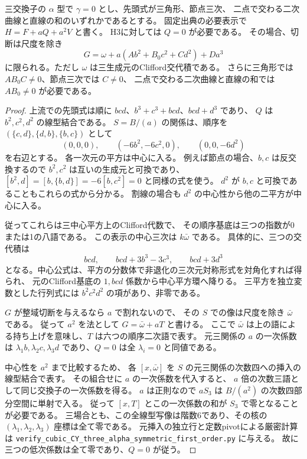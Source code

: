 \begin{proposition}\label{prop:cubic-CY-three-alpha-symmetric-singular}
三交換子の $\alpha$ 型で $\gamma=0$ とし、先頭式が三角形、節点三次、
二点で交わる二次曲線と直線の和のいずれかであるとする。
固定出典\cite{AS4CYpinned}の必要表示で $H=F+aQ+a^2V$ と書く。
H3に対しては $Q=0$ が必要である。
その場合、切断は尺度を除き
\[
 G=\omega+a(A b^2+B_0 c^2+C d^2)+D a^3
\]
に限られる。ただし $\omega$ は三生成元のClifford交代積である。
さらに三角形では $AB_0C\ne0$、節点三次では $C\ne0$、
二点で交わる二次曲線と直線の和では $AB_0\ne0$ が必要である。
\end{proposition}
\begin{proof}
上流での先頭式は順に $bcd$、$b^3+c^3+bcd$、$bcd+d^3$ であり、
$Q$ は $b^2,c^2,d^2$ の線型結合である。
$S=B/(a)$ の関係は、順序を $(\{c,d\},\{d,b\},\{b,c\})$ として
\[
 (0,0,0),\qquad (-6b^2,-6c^2,0),\qquad (0,0,-6d^2)
\]
を右辺とする。
各一次元の平方は中心に入る。
例えば節点の場合、$b,c$ は反交換するので $b^2,c^2$ は互いの生成元と可換であり、
$[b^2,d]=[b,\{b,d\}]=-6[b,c^2]=0$ と同様の式を使う。
$d^2$ が $b,c$ と可換であることもこれらの式から分かる。
割線の場合も $d^2$ の中心性から他の二平方が中心に入る。

従ってこれらは三中心平方上のClifford代数で、
その順序基底は三つの指数が0または1の八語である。
この表示の中心三次は $k\bar\omega$ である。
具体的に、三つの交代積は
\[
 bcd,\qquad bcd+3b^3-3c^3,\qquad bcd+3d^3
\]
となる。中心公式は、平方の分数体で非退化の三次元対称形式を対角化すれば得られ、
元のClifford基底の $1,bcd$ 係数から中心平方環へ降りる。
三平方を独立変数とした行列式には $b^2c^2d^2$ の項があり、非零である。

$G$ が整域切断を与えるなら $a$ で割れないので、
その $S$ での像は尺度を除き $\bar\omega$ である。
従って $a^2$ を法として $G=\bar\omega+aT$ と書ける。
ここで $\bar\omega$ は上の語による持ち上げを意味し、$T$ は六つの順序二次語で表す。
元三関係の $a$ の一次係数は
$\lambda_1 b,\lambda_2 c,\lambda_3 d$ であり、$Q=0$ は全 $\lambda_i=0$ と同値である。

中心性を $a^2$ まで比較するため、
各 $[x,\bar\omega]$ を $S$ の元三関係の次数四への挿入の線型結合で表す。
その組合せに $a$ の一次係数を代入すると、
$a$ 倍の次数三語として同じ交換子の一次係数を得る。
$a$ は正則なので $aS_3$ は $B/(a^2)$ の次数四部分空間に単射で入る。
従って $[x,T]$ とこの一次係数の和が $S_3$ で零となることが必要である。
三場合とも、この全線型写像は階数6であり、その核の
$(\lambda_1,\lambda_2,\lambda_3)$ 座標は全て零である。
元挿入の独立行と定数pivotによる厳密計算は
\texttt{verify\_cubic\_CY\_three\_alpha\_symmetric\_first\_order.py} に与える。
故に三つの低次係数は全て零であり、$Q=0$ が従う。


\end{proof}
